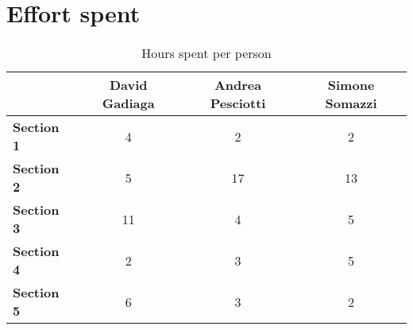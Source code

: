 \chapter{Effort spent}

\begin{table}[!ht]
    \centering 
    \begin{tabular}{|p{5em} | c | c | c |}
    \hline
    \rowcolor{bluepoli!40} 
    \textbf{ } &\textbf{David Gadiaga} & \textbf{Andrea Pesciotti} & \textbf{Simone Somazzi} \T\B \\
    \hline \hline
    \textbf{Section 1} & 4 & 2 & 2 \T\B \\
    \hline
    \textbf{Section 2} & 5 & 17 & 13 \T\B\\
    \hline
    \textbf{Section 3} & 11 & 4 & 5 \T\B\\
    \hline
    \textbf{Section 4} & 2 & 3 & 5 \T\B\\
    \hline
    \textbf{Section 5} & 6 & 3 & 2 \T\B\\
    \hline
    \end{tabular}
    \\[10pt]
    \caption{Hours spent per person}
    \label{table:example}
\end{table}